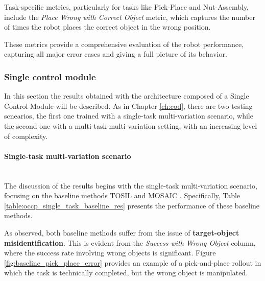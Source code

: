 Task-specific metrics, particularly for tasks like Pick-Place and Nut-Assembly, include the 
\textit{Place Wrong with Correct Object} metric, which captures the number of times the robot places the correct object in the wrong position.

These metrics provide a comprehensive evaluation of the robot performance, capturing all major error cases and giving a full picture of its behavior.

\subsubsection{Single control module}
In this section the results obtained with the architecture composed of a Single Control Module will be described. As in Chapter \ref{ch:cod}, there are two testing scnearios, the first one trained with a single-task  multi-variation scenario, while the second one with a multi-task multi-variation setting, with an increasing level of complexity.
\label{sec:ocpl_results_scm}
\paragraph*{Single-task multi-variation scenario}\mbox{}\\

The discussion of the results begins with the single-task multi-variation scenario, focusing on the baseline methods TOSIL \cite{dasari2021transformers_one_shot} and MOSAIC \cite{mandi2022towards_more_generalizable_one_shot}. Specifically, Table \ref{table:occp_single_task_baseline_res} presents the performance of these baseline methods. 


As observed, both baseline methods suffer from the issue of \textbf{target-object misidentification}. This is evident from the \textit{Success with Wrong Object} column, where the success rate involving wrong objects is significant. Figure \ref{fig:baseline_pick_place_error} provides an example of a pick-and-place rollout in which the task is technically completed, but the wrong object is manipulated.


